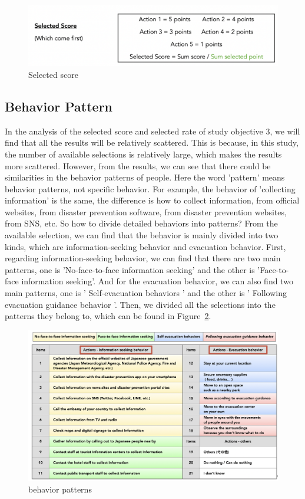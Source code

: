 \begin{figure}[h]
  \includegraphics[width=\linewidth]{Figure/Figure11.png}
  \centering
  \caption{Selected score}
  \label{fig11}
\end{figure}

\subsection{Behavior Pattern}

In the analysis of the selected score and selected rate of study objective 3, we will find that all the results will be relatively scattered. This is because, in this study, the number of available selections is relatively large, which makes the results more scattered. However, from the results, we can see that there could be similarities in the behavior patterns of people. Here the word 'pattern' means behavior patterns, not specific behavior. For example, the behavior of  'collecting information' is the same, the difference is how to collect information, from official websites, from disaster prevention software, from disaster prevention websites, from SNS, etc. So how to divide detailed behaviors into patterns? From the available selection, we can find that the behavior is mainly divided into two kinds, which are information-seeking behavior and evacuation behavior. First, regarding information-seeking behavior, we can find that there are two main patterns, one is 'No-face-to-face information seeking' and the other is 'Face-to-face information seeking'. And for the evacuation behavior, we can also find two main patterns, one is ' Self-evacuation behaviors ' and the other is ' Following evacuation guidance behavior '. Then, we divided all the selections into the patterns they belong to, which can be found in Figure~\ref{fig12}.

\begin{figure}[h]
  \includegraphics[width=\linewidth]{Figure/Figure12.png}
  \centering
  \caption{behavior patterns}
  \label{fig12}
\end{figure}


